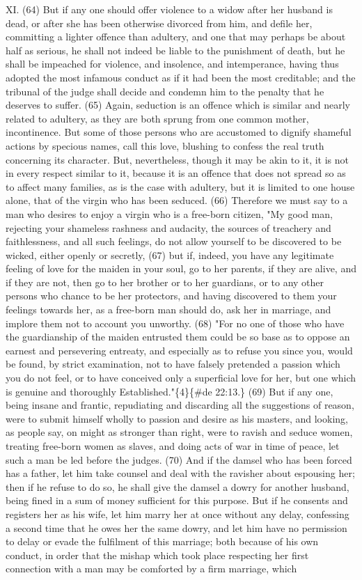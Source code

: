 \documentclass[11pt]{article}
\begin{document}
XI. (64) But if any one should offer violence to a widow after her husband is dead, or after she has been otherwise divorced from him, and defile her, committing a lighter offence than adultery, and one that may perhaps be about half as serious, he shall not indeed be liable to the punishment of death, but he shall be impeached for violence, and insolence, and intemperance, having thus adopted the most infamous conduct as if it had been the most creditable; and the tribunal of the judge shall decide and condemn him to the penalty that he deserves to suffer. (65) Again, seduction is an offence which is similar and nearly related to adultery, as they are both sprung from one common mother, incontinence. But some of those persons who are accustomed to dignify shameful actions by specious names, call this love, blushing to confess the real truth concerning its character. But, nevertheless, though it may be akin to it, it is not in every respect similar to it, because it is an offence that does not spread so as to affect many families, as is the case with adultery, but it is limited to one house alone, that of the virgin who has been seduced. (66) Therefore we must say to a man who desires to enjoy a virgin who is a free-born citizen, "My good man, rejecting your shameless rashness and audacity, the sources of treachery and faithlessness, and all such feelings, do not allow yourself to be discovered to be wicked, either openly or secretly, (67) but if, indeed, you have any legitimate feeling of love for the maiden in your soul, go to her parents, if they are alive, and if they are not, then go to her brother or to her guardians, or to any other persons who chance to be her protectors, and having discovered to them your feelings towards her, as a free-born man should do, ask her in marriage, and implore them not to account you unworthy. (68) "For no one of those who have the guardianship of the maiden entrusted them could be so base as to oppose an earnest and persevering entreaty, and especially as to refuse you since you, would be found, by strict examination, not to have falsely pretended a passion which you do not feel, or to have conceived only a superficial love for her, but one which is genuine and thoroughly Established."\{4\}\{\#de 22:13.\} (69) But if any one, being insane and frantic, repudiating and discarding all the suggestions of reason, were to submit himself wholly to passion and desire as his masters, and looking, as people say, on might as stronger than right, were to ravish and seduce women, treating free-born women as slaves, and doing acts of war in time of peace, let such a man be led before the judges. (70) And if the damsel who has been forced has a father, let him take counsel and deal with the ravisher about espousing her; then if he refuse to do so, he shall give the damsel a dowry for another husband, being fined in a sum of money sufficient for this purpose. But if he consents and registers her as his wife, let him marry her at once without any delay, confessing a second time that he owes her the same dowry, and let him have no permission to delay or evade the fulfilment of this marriage; both because of his own conduct, in order that the mishap which took place respecting her first connection with a man may be comforted by a firm marriage, which 
\end{document}

